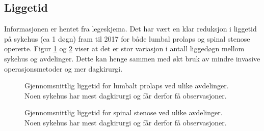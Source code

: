 \documentclass [norsk,a4paper,twoside]{article}\usepackage[]{graphicx}\usepackage[]{color}
\begin{document}
\clearpage


\subsection{Liggetid}

Informasjonen er hentet fra legeskjema.
Det har vært en klar reduksjon i liggetid  på sykehus (ca 1 døgn) fram til 2017 for både lumbal prolaps og spinal stenose opererte. Figur \ref{fig:LiggetidAvdPro} og \ref{fig:LiggetidAvdSS} viser at det er stor variasjon i antall liggedøgn mellom sykehus og avdelinger.
Dette kan henge sammen med økt bruk av mindre invasive operasjonsmetoder og mer dagkirurgi. 


      
      
      


\begin{figure}[h] 
\caption{Gjennomsnittlig liggetid for lumbalt prolaps ved ulike avdelinger. Noen sykehus har mest dagkirurgi og får derfor få observasjoner. } 
\label{fig:LiggetidAvdPro}
\end{figure}

\begin{figure}[h] 
\caption{Gjennomsnittlig liggetid for spinal stenose ved ulike avdelinger. Noen sykehus har mest dagkirurgi og får derfor få observasjoner. } 
\label{fig:LiggetidAvdSS}
\end{figure}


      
      
      
      
      \clearpage
\end{document}
